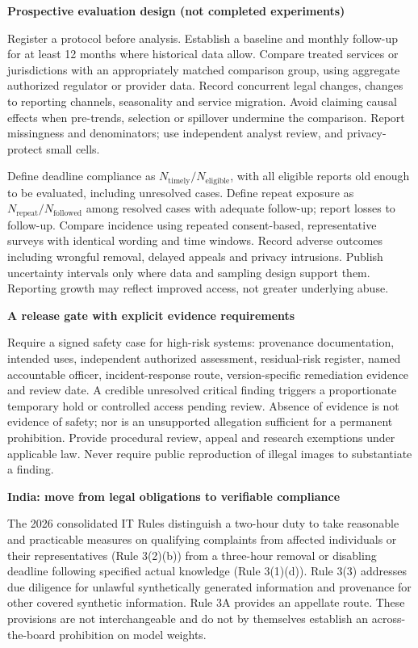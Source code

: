\documentclass[10pt,a4paper]{article}
\newcommand{\sub}[1]{\vspace{1mm}\textbf{#1}\par}
\begin{document}
\sub{Prospective evaluation design (not completed experiments)}
Register a protocol before analysis. Establish a baseline and monthly follow-up for at least 12 months where historical data allow. Compare treated services or jurisdictions with an appropriately matched comparison group, using aggregate authorized regulator or provider data. Record concurrent legal changes, changes to reporting channels, seasonality and service migration. Avoid claiming causal effects when pre-trends, selection or spillover undermine the comparison. Report missingness and denominators; use independent analyst review, and privacy-protect small cells.

Define deadline compliance as $N_{\mathrm{timely}}/N_{\mathrm{eligible}}$, with all eligible reports old enough to be evaluated, including unresolved cases. Define repeat exposure as $N_{\mathrm{repeat}}/N_{\mathrm{followed}}$ among resolved cases with adequate follow-up; report losses to follow-up. Compare incidence using repeated consent-based, representative surveys with identical wording and time windows. Record adverse outcomes including wrongful removal, delayed appeals and privacy intrusions. Publish uncertainty intervals only where data and sampling design support them. Reporting growth may reflect improved access, not greater underlying abuse.

\sub{A release gate with explicit evidence requirements}
Require a signed safety case for high-risk systems: provenance documentation, intended uses, independent authorized assessment, residual-risk register, named accountable officer, incident-response route, version-specific remediation evidence and review date. A credible unresolved critical finding triggers a proportionate temporary hold or controlled access pending review. Absence of evidence is not evidence of safety; nor is an unsupported allegation sufficient for a permanent prohibition. Provide procedural review, appeal and research exemptions under applicable law. Never require public reproduction of illegal images to substantiate a finding.

\sub{India: move from legal obligations to verifiable compliance}
The 2026 consolidated IT Rules distinguish a two-hour duty to take reasonable and practicable measures on qualifying complaints from affected individuals or their representatives (Rule 3(2)(b)) from a three-hour removal or disabling deadline following specified actual knowledge (Rule 3(1)(d)). Rule 3(3) addresses due diligence for unlawful synthetically generated information and provenance for other covered synthetic information. Rule 3A provides an appellate route. These provisions are not interchangeable and do not by themselves establish an across-the-board prohibition on model weights. \cite{indiafull}
\end{document}
